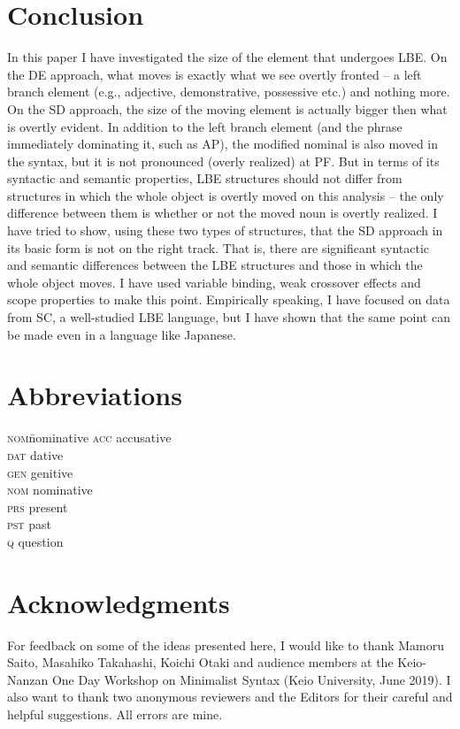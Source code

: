 \documentclass[output=paper]{langscibook}
\begin{document}
\section{Conclusion} \label{s4de}
In this paper I have investigated the size of the element that undergoes LBE. On the DE approach, what moves is exactly what we see overtly fronted – a left branch element (e.g., adjective, demonstrative, possessive etc.) and nothing more. On the SD approach, the size of the moving element is actually bigger then what is overtly evident. In addition to the left branch element (and the phrase immediately dominating it, such as AP), the modified nominal is also moved in the syntax, but it is not pronounced (overly realized) at PF. But in terms of its syntactic and semantic properties, LBE structures should not differ from structures in which the whole object is overtly moved on this analysis – the only difference between them is whether or not the moved noun is overtly realized. I have tried to show, using these two types of structures, that the SD approach in its basic form is not on the right track. That is, there are significant syntactic and semantic differences between the LBE structures and those in which the whole object moves.  I have used variable binding, weak crossover effects and scope properties to make this point. Empirically speaking, I have focused on data from SC, a well-studied LBE language, but I have shown that the same point can be made even in a language like Japanese. 

\section*{Abbreviations}

\begin{multicols}{4}
\begin{tabbing}
\textsc{nom}\hspace{1ex}\= nominative \kill
\textsc{acc} \> accusative  \\
\textsc{dat} \> dative     \\
\textsc{gen} \> genitive  \\
\textsc{nom} \> nominative \\        
\textsc{prs} \> present  \\
\textsc{pst} \> past     \\
\textsc{q}   \> question
\end{tabbing}
\end{multicols}

\section*{Acknowledgments}

For feedback on some of the ideas presented here, I would like to thank Mamoru Saito, Masahiko Takahashi, Koichi Otaki and audience members at the Keio-Nanzan One Day Workshop on Minimalist Syntax (Keio University, June 2019). I also want to thank two anonymous reviewers and the Editors for their careful and helpful suggestions. All errors are mine. 

{\sloppy\printbibliography[heading=subbibliography,notkeyword=this]}
\end{document}
